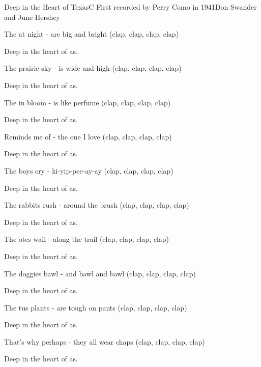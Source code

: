 \begin{SBSong}{Deep in the Heart of Texas}{C}
    {First recorded by Perry Como in 1941}{Don Swander and June Hershey}
  \begin{SBVerse}
    The  at night - are big and bright (clap, clap, clap, clap)
    
    Deep in the heart of as. 
            
    The prairie sky - is wide and high (clap, clap, clap, clap)
    
    Deep in the heart of as.
  \end{SBVerse}
  \begin{SBVerse}
    The  in bloom - is like perfume (clap, clap, clap, clap)
    
    Deep in the heart of as. 
    
    Reminds me of - the one I love (clap, clap, clap, clap)
    
    Deep in the heart of as. 
  \end{SBVerse}
  \begin{SBVerse}
    The boys cry - ki-yip-pee-ay-ay (clap, clap, clap, clap)
    
    Deep in the heart of as.

    The rabbits rush - around the brush (clap, clap, clap, clap)
    
    Deep in the heart of as.
  \end{SBVerse}
  \begin{SBVerse}
    The otes wail - along the trail (clap, clap, clap, clap)
    
    Deep in the heart of as.
    
    The doggies bawl - and bawl and bawl (clap, clap, clap, clap)
    
    Deep in the heart of as. 
  \end{SBVerse}
  \begin{SBVerse}
    The tus plants - are tough on pants (clap, clap, clap, clap)
    
    Deep in the heart of as. 
    
    That's why perhaps - they all wear chaps (clap, clap, clap, clap)
    
    Deep in the heart of as.
  \end{SBVerse}
\end{SBSong}

